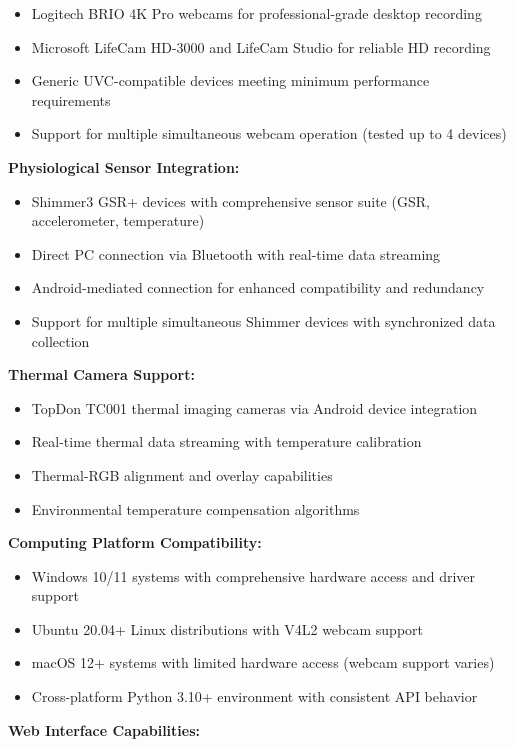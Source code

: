 \documentclass[12pt,a4paper]{article}
\begin{document}
\begin{itemize}
\item Logitech BRIO 4K Pro webcams for professional-grade desktop recording
\item Microsoft LifeCam HD-3000 and LifeCam Studio for reliable HD recording
\item Generic UVC-compatible devices meeting minimum performance requirements
\item Support for multiple simultaneous webcam operation (tested up to 4 devices)

\end{itemize}
\textbf{Physiological Sensor Integration:}

\begin{itemize}
\item Shimmer3 GSR+ devices with comprehensive sensor suite (GSR, accelerometer, temperature)
\item Direct PC connection via Bluetooth with real-time data streaming
\item Android-mediated connection for enhanced compatibility and redundancy
\item Support for multiple simultaneous Shimmer devices with synchronized data collection

\end{itemize}
\textbf{Thermal Camera Support:}

\begin{itemize}
\item TopDon TC001 thermal imaging cameras via Android device integration
\item Real-time thermal data streaming with temperature calibration
\item Thermal-RGB alignment and overlay capabilities
\item Environmental temperature compensation algorithms

\end{itemize}
\textbf{Computing Platform Compatibility:}

\begin{itemize}
\item Windows 10/11 systems with comprehensive hardware access and driver support
\item Ubuntu 20.04+ Linux distributions with V4L2 webcam support
\item macOS 12+ systems with limited hardware access (webcam support varies)
\item Cross-platform Python 3.10+ environment with consistent API behavior

\end{itemize}
\textbf{Web Interface Capabilities:}
\end{document}
